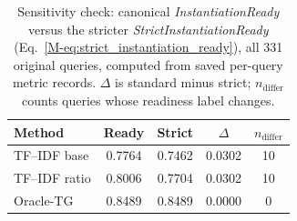 \begin{table}[t]
\centering
  \renewcommand{\arraystretch}{1.18}
\caption{Sensitivity check: canonical \textit{InstantiationReady} versus the stricter \textit{StrictInstantiationReady} (Eq.~\eqref{M-eq:strict_instantiation_ready}), all 331 original queries, computed from saved per-query metric records. $\Delta$ is standard minus strict; $n_{\text{differ}}$ counts queries whose readiness label changes.}
\label{tab:strict-instready}
\small
\setlength{\tabcolsep}{2.4pt}
\begin{tabular}{lcccc}
  \toprule
  Method & Ready & Strict & $\Delta$ & $n_{\text{differ}}$ \\
  \midrule
TF--IDF base & 0.7764 & 0.7462 & 0.0302 & 10 \\
TF--IDF ratio & 0.8006 & 0.7704 & 0.0302 & 10 \\
Oracle-TG & 0.8489 & 0.8489 & 0.0000 & 0 \\
  \bottomrule
\end{tabular}
\end{table}
